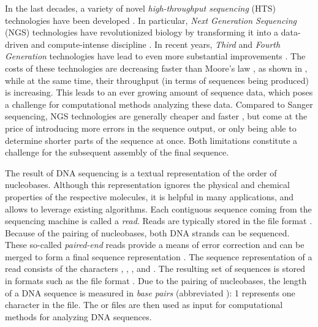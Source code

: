In the last decades, a variety of novel \emph{high-throughput sequencing} (HTS) technologies
have been developed \cite{Pettersson2009,Reuter2015,Goodwin2016}.
In particular, \emph{Next Generation Sequencing} (NGS) technologies \cite{Logares2012,Mardis2013}
have revolutionized biology by transforming it into a data-driven and compute-intense discipline \cite{Escobar-Zepeda2015}.
In recent years, \emph{Third} and \emph{Fourth Generation} technologies
have lead to even more substantial improvements \cite{Pareek2011,Niedringhaus2011,Mignardi2014,Heather2016}.
The costs of these technologies are decreasing faster than Moore's law \cite{Moore1965,Wetterstrand2018},
as shown in ,
while at the same time, their throughput (in terms of sequences being produced) is increasing.
This leads to an ever growing amount of sequence data,
which poses a challenge for computational methods analyzing these data.
Compared to Sanger sequencing, NGS technologies are generally cheaper and faster \cite{Voelkerding2009,Metzker2010},
but come at the price of introducing more errors in the sequence output,
or only being able to determine shorter parts of the sequence at once.
Both limitations constitute a challenge for the subsequent assembly of the final sequence.

The result of \ac{DNA} sequencing is a textual representation of the order of nucleobases.
Although this representation ignores the physical and chemical properties of the respective molecules,
it is helpful in many applications, and allows to leverage existing algorithms.
Each contiguous sequence coming from the sequencing machine is called a \emph{read}.
Reads are typically stored in the  file format \cite{Cock2009}.
Because of the pairing of nucleobases, both \ac{DNA} strands can be sequenced.
These so-called \emph{paired-end} reads provide a means of error correction
and can be merged to form a final sequence representation \cite{Zhang2014}.
The sequence representation of a read consists of
the characters , , , and .
The resulting set of sequences is stored in formats such as the  file format \cite{Pearson1988}.
Due to the pairing of nucleobases,
the length of a \ac{DNA} sequence is measured in \emph{base pairs} (abbreviated \si{\basepair}):
\SI{1}{\basepair} represents one character in the file.
The  or  files are then used as input
for computational methods for analyzing \ac{DNA} sequences.

